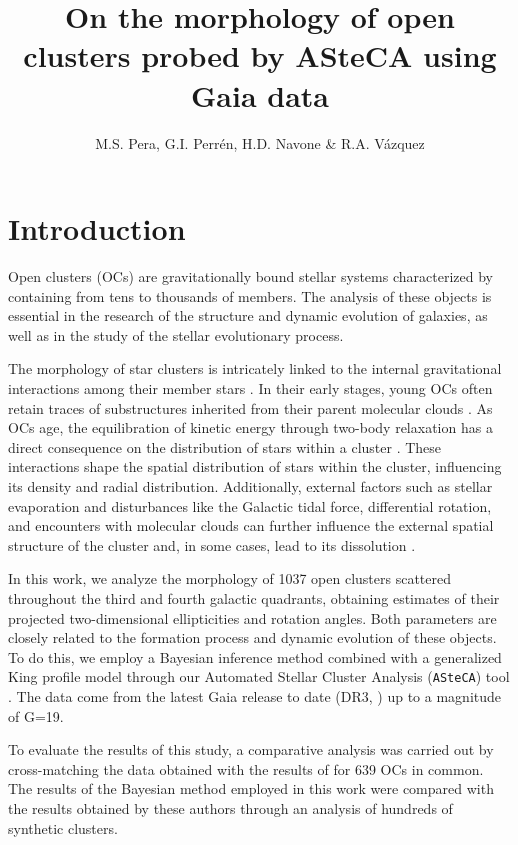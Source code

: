 \documentclass[baaa]{baaa}
\title{On the morphology of open clusters probed by ASteCA using Gaia data}
\author{
M.S. Pera\inst{1, 3},
G.I. Perr\'en\inst{2, 3},
H.D. Navone\inst{1, 3}
\&
R.A. V\'azquez\inst{2}
}
\institute{
Instituto de F{\'\i}sica de Rosario, CONICET--UNR, Argentina
\and
Instituto de F{\'\i}sica de La Plata, CONICET--UNLP, Argentina
\and
Facultad de Ciencias Exactas, Ingenier{\'\i}a y Agrimensura, UNR, Argentina
}
\begin{document}
\maketitle
\section{Introduction}

Open clusters (OCs) are gravitationally bound stellar systems characterized by containing from tens to thousands of members. The analysis of these objects is essential in the research of the structure and dynamic evolution of galaxies, as well as in the study of the stellar evolutionary process. 


The morphology of star clusters is intricately linked to the internal gravitational interactions among their member stars . In their early stages, young OCs often retain traces of substructures inherited from their parent molecular clouds \citep{Alves_2020}. As OCs age, the equilibration of kinetic energy through two-body relaxation has a direct consequence on the distribution of stars within a cluster \citep{Kroupa_1995, deLaFuente_1996}. These interactions shape the spatial distribution of stars within the cluster, influencing its density and radial distribution. Additionally, external factors such as stellar evaporation and disturbances like the Galactic tidal force, differential rotation, and encounters with molecular clouds can further influence the external spatial structure of the cluster and, in some cases, lead to its dissolution \citep{Dinnbier_Kroupa_2020,2022A&A...659A..59T}.

In this work, we analyze the morphology of 1037 open clusters scattered throughout the third and fourth galactic quadrants, obtaining estimates of their projected two-dimensional ellipticities and rotation angles. Both parameters are closely related to the formation process and dynamic evolution of these objects. To do this, we employ a Bayesian inference method combined with a generalized King profile model through our Automated Stellar Cluster Analysis (\texttt{ASteCA}) tool \citep{2015A&A...576A...6P}. The data come from the latest Gaia release to date (DR3, \cite{2023A&A...674A...1G}) up to a magnitude of G=19.

To evaluate the results of this study, a comparative analysis was carried out by cross-matching the data obtained with the results of \cite{2021A&A...656A..49H} for 639 OCs in common. The results of the Bayesian method employed in this work were compared with the results obtained by these authors through an analysis of hundreds of synthetic clusters.
\end{document}
